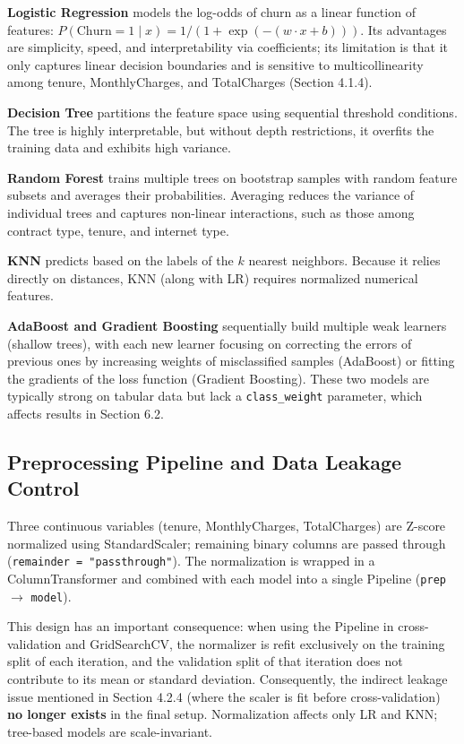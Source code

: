 \textbf{Logistic Regression} models the log-odds of churn as a linear function of features: $P(\text{Churn} = 1 \mid x) = 1 / (1 + \exp(-(w \cdot x + b)))$. Its advantages are simplicity, speed, and interpretability via coefficients; its limitation is that it only captures linear decision boundaries and is sensitive to multicollinearity among tenure, MonthlyCharges, and TotalCharges (Section 4.1.4).

\textbf{Decision Tree} partitions the feature space using sequential threshold conditions. The tree is highly interpretable, but without depth restrictions, it overfits the training data and exhibits high variance.

\textbf{Random Forest} trains multiple trees on bootstrap samples with random feature subsets and averages their probabilities. Averaging reduces the variance of individual trees and captures non-linear interactions, such as those among contract type, tenure, and internet type.

\textbf{KNN} predicts based on the labels of the $k$ nearest neighbors. Because it relies directly on distances, KNN (along with LR) requires normalized numerical features.

\textbf{AdaBoost and Gradient Boosting} sequentially build multiple weak learners (shallow trees), with each new learner focusing on correcting the errors of previous ones by increasing weights of misclassified samples (AdaBoost) or fitting the gradients of the loss function (Gradient Boosting). These two models are typically strong on tabular data but lack a \texttt{class\_weight} parameter, which affects results in Section 6.2.

\subsection{ Preprocessing Pipeline and Data Leakage Control}

Three continuous variables (tenure, MonthlyCharges, TotalCharges) are Z-score normalized using StandardScaler; remaining binary columns are passed through (\texttt{remainder = "passthrough"}). The normalization is wrapped in a ColumnTransformer and combined with each model into a single Pipeline (\texttt{prep} $\rightarrow$ \texttt{model}).

This design has an important consequence: when using the Pipeline in cross-validation and GridSearchCV, the normalizer is refit exclusively on the training split of each iteration, and the validation split of that iteration does not contribute to its mean or standard deviation. Consequently, the indirect leakage issue mentioned in Section 4.2.4 (where the scaler is fit before cross-validation) \textbf{no longer exists} in the final setup. Normalization affects only LR and KNN; tree-based models are scale-invariant.

